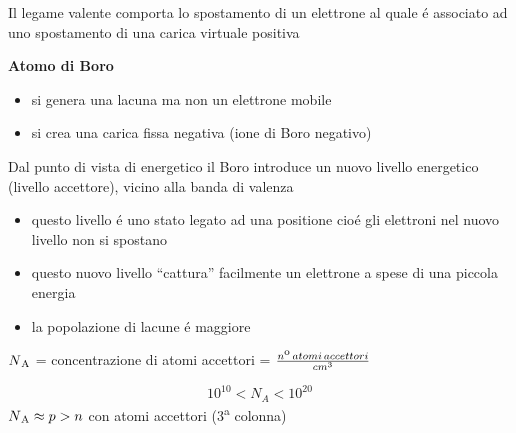 \documentclass{article}
\begin{document}
Il legame valente comporta lo spostamento di un elettrone al quale \'e associato ad uno spostamento di una carica virtuale positiva

\textbf{Atomo di Boro}
\begin{itemize}
    \item si genera una lacuna ma non un elettrone mobile
    \item si crea una carica fissa negativa (ione di Boro negativo)
\end{itemize}

Dal punto di vista di energetico il Boro introduce un nuovo livello energetico (livello accettore), vicino alla banda di valenza
\begin{itemize}
    \item questo livello \'e uno stato legato ad una positione cio\'e gli elettroni nel nuovo livello non si spostano
    \item questo nuovo livello ``cattura'' facilmente un elettrone a spese di una piccola energia
    \item la popolazione di lacune \'e maggiore
\end{itemize}

$N\textsubscript{A}$ = concentrazione di atomi accettori = $\frac{n\textsuperscript{o}\,atomi\,accettori}{cm^3}$

\[
    10^{10} < N_{A} < 10^{20}
\]
$N\textsubscript{A} \approx p > n$ con atomi accettori (3\textsuperscript{a} colonna)
\end{document}
